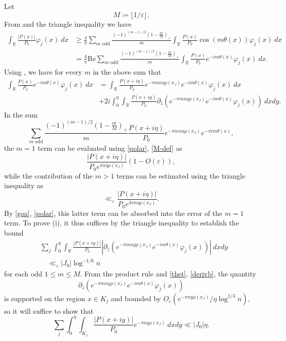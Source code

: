 \documentclass[12pt]{amsart}
\newcommand{\eps}{\varepsilon}
\newcommand{\R}{\mathbb{R}}
\renewcommand{\Re}{\mathrm{Re}}
\begin{document}
Let
\begin{equation}\label{M-def}
    M \coloneqq \lfloor 1/\eps \rfloor.
\end{equation}
From  and the triangle inequality we have
\begin{align*}
\int_\R \frac{|P(x)|}{P_0} \varphi_j(x)\ dx &\geq \frac{4}{\pi} \sum_{m \text{ odd}} \frac{(-1)^{(m-1)/2} (1-\frac{m}{M})_+}{m} \int_\R \frac{P(x)}{P_0} \cos(m\theta(x)) \varphi_j(x)\ dx\\
&= \frac{4}{\pi} \Re \sum_{m \text{ odd}} \frac{(-1)^{(m-1)/2} (1-\frac{m}{M})_+}{m} \int_\R \frac{P(x)}{P_0} e^{-im\theta(x)} \varphi_j(x)\ dx.
\end{align*}
Using , we have for every $m$ in the above sum that
\begin{align*} \int_\R \frac{P(x)}{P_0} e^{-im\theta(x)} \varphi_j(x)\ dx &= \int_\R \frac{P(x+i\eta)}{P_0} e^{-\pi m n\eta \rho(x_J)} e^{-im\theta(x)} \varphi_j(x)\ dx \\
\quad &+ 2i \int_0^\eta \int_\R \frac{P(x+iy)}{P_0} \partial_{\bar z} (e^{-\pi mn y \rho(x_J)} e^{-i m \theta(x)} \varphi_j(x))\ dx dy.
\end{align*}
In the sum
$$\sum_{m \text{ odd}} \frac{(-1)^{(m-1)/2} (1-\frac{m}{M})_+}{m} \frac{P(x+i\eta)}{P_0} e^{-\pi mn \eta \rho(x_J)} e^{-\pi im\theta(x)},$$
the $m=1$ term can be evaluated using \eqref{polar}, \eqref{M-def} as
$$ \frac{|P(x+i\eta)|}{P_0 e^{\pi n \eta \rho(x_J)}} (1 - O(\eps)),$$
while the contribution of the $m > 1$ terms can be estimated using the triangle inequality as
$$ \ll_\eps \frac{|P(x+i\eta)|}{P_0 e^{3 \pi n \eta \rho(x_J)}}.$$
By \eqref{goa}, \eqref{polar}, this latter term can be absorbed into the error of the $m=1$ term.
To prove (i), it thus suffices by the triangle inequality to establish the bound
\begin{align*}
    &\sum_j \int_0^\eta \int_\R \frac{|P(x+iy)|}{P_0} |\partial_{\bar z} (e^{-\pi mn y \rho(x_J)} e^{-i m \theta(x)} \varphi_j(x))|\ dx dy \\
    &\quad \ll_\eps |J_0| \log^{-1/6} n
\end{align*}
for each odd $1 \leq m \leq M$.  From the product rule and \eqref{thet}, \eqref{derivb}, the quantity
$$\partial_{\bar z} (e^{-\pi mn y \rho(x_J)} e^{-i m \theta(x)} \varphi_j(x))$$
is supported on the region $x \in K_j$ and bounded by $O_\eps(e^{-\pi n y \rho(x_J)} / \eta \log^{1/3} n)$, so it will suffice to show that
$$ \sum_j \int_0^\eta \int_{K_j} \frac{|P(x+iy)|}{P_0} e^{-\pi n y \rho(x_J)}\ dx dy \ll |J_0| \eta.$$
\end{document}
